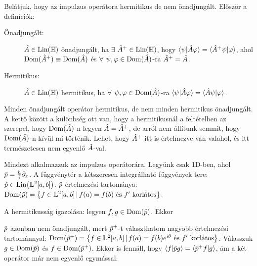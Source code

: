    Belátjuk, hogy az impulzus operátora hermitikus de nem önadjungált. Először a definíciók:
   \begin{description}
    \item[Önadjungált:] $\hat{A}\in\mathrm{Lin}(\mathbb{H})$ önadjungált, ha $\exists$ $\hat{A}^+\in\mathrm{Lin}(\mathbb{H})$, hogy  $\langle\psi\rvert\hat{A}\varphi\rangle=\langle\hat{A}^+\psi\rvert\varphi\rangle$, ahol $\mathrm{Dom}(\hat{A}^+)\equiv\mathrm{Dom}(\hat{A})$ és $\forall$ $\psi,\varphi\in\mathrm{Dom}(\hat{A})$-ra $\hat{A}^+=\hat{A}$.
    \item[Hermitikus:] $\hat{A}\in\mathrm{Lin}(\mathbb{H})$ hermitikus, ha $\forall$ $\psi,\varphi\in\mathrm{Dom}(\hat{A})$-ra  $\langle\psi\rvert\hat{A}\varphi\rangle=\langle\hat{A}\psi\rvert\varphi\rangle$.
   \end{description}
   Minden önadjungált operátor hermitikus, de nem minden hermitikus önadjungált. A kettő között a különbség ott van, hogy a hermitikusnál a feltételben az szerepel, hogy $\mathrm{Dom}(\hat{A})$-n legyen $\hat{A}=\hat{A}^+$, de arról nem állítunk semmit, hogy $\mathrm{Dom}(\hat{A})$-n kívül mi történik. Lehet, hogy $\hat{A}^+$ itt is értelmezve van valahol, és itt természetesen nem egyenlő $\hat{A}$-val.
   
   Mindezt alkalmazzuk az impulzus operátorára. Legyünk csak 1D-ben, ahol $\hat{p}=\frac{\hbar}{i}\partial_x$. A függvénytér a kétszeresen integrálható függvények tere: $\hat{p}\in\mathrm{Lin}\big(\mathbb{L}^2[a,b]\big)$. $\hat{p}$ értelmezési tartománya: $\mathrm{Dom}(\hat{p})=\big\{f\in\mathbb{L}^2[a,b]\,|\,f(a)=f(b)\text{ és $f'$ korlátos}\big\}$. 
   
   A hermitikusság igazolása: legyen $f,g\in\mathrm{Dom}(\hat{p})$. Ekkor
   
   $\hat{p}$ azonban nem önadjungált, mert $\hat{p}^+$-t választhatom nagyobb értelmezési tartománnyal: $\mathrm{Dom}(\hat{p}^+)=\big\{f\in\mathbb{L}^2[a,b]\,|\,f(a)=f(b)e^{i\theta}\text{ és $f'$ korlátos}\big\}$. Válasszuk $g\in\mathrm{Dom}(\hat{p})$ és $f\in\mathrm{Dom}(\hat{p}^+)$. Ekkor is fennáll, hogy $\langle f\rvert\hat{p}g\rangle=\langle\hat{p}^+f\rvert g\rangle$, ám a két operátor már nem egyenlő egymással.
   
